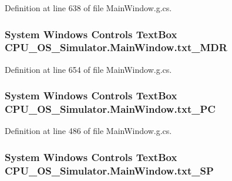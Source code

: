 Definition at line 638 of file Main\+Window.\+g.\+cs.

\hypertarget{class_c_p_u___o_s___simulator_1_1_main_window_a1aa53d1512aa84e476b3649dcda5ced0}{}
\subsubsection[{txt\+\_\+\+M\+D\+R}]{\setlength{\rightskip}{0pt plus 5cm}System Windows Controls Text\+Box C\+P\+U\+\_\+\+O\+S\+\_\+\+Simulator.\+Main\+Window.\+txt\+\_\+\+M\+D\+R\hspace{0.3cm}{\ttfamily [package]}}\label{class_c_p_u___o_s___simulator_1_1_main_window_a1aa53d1512aa84e476b3649dcda5ced0}


Definition at line 654 of file Main\+Window.\+g.\+cs.

\hypertarget{class_c_p_u___o_s___simulator_1_1_main_window_a7100765f8e26fa4c97a76dd445942b97}{}
\subsubsection[{txt\+\_\+\+P\+C}]{\setlength{\rightskip}{0pt plus 5cm}System Windows Controls Text\+Box C\+P\+U\+\_\+\+O\+S\+\_\+\+Simulator.\+Main\+Window.\+txt\+\_\+\+P\+C\hspace{0.3cm}{\ttfamily [package]}}\label{class_c_p_u___o_s___simulator_1_1_main_window_a7100765f8e26fa4c97a76dd445942b97}


Definition at line 486 of file Main\+Window.\+g.\+cs.

\hypertarget{class_c_p_u___o_s___simulator_1_1_main_window_ac2427655774b9ca2b4c368651d5cd9de}{}
\subsubsection[{txt\+\_\+\+S\+P}]{\setlength{\rightskip}{0pt plus 5cm}System Windows Controls Text\+Box C\+P\+U\+\_\+\+O\+S\+\_\+\+Simulator.\+Main\+Window.\+txt\+\_\+\+S\+P\hspace{0.3cm}{\ttfamily [package]}}\label{class_c_p_u___o_s___simulator_1_1_main_window_ac2427655774b9ca2b4c368651d5cd9de}


